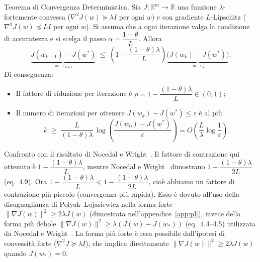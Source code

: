 \documentclass[a4paper,12pt]{article}
\numberwithin{equation}{section}
\numberwithin{figure}{section}
\numberwithin{table}{section}
\begin{document}
\newpage
\begin{thmbox}
  Teorema di Convergenza Deterministica.
  Sia $J: \mathbb{R}^m \to \mathbb{R}$ una funzione $\lambda$-fortemente convessa ($\nabla^2 J(w) \succeq \lambda I$ per ogni $w$) e con gradiente $L$-Lipschitz ($\nabla^2 J(w) \preceq LI$ per ogni $w$).
  Si assuma che a ogni iterazione valga la condizione di accuratezza e si scelga il passo 
  $\alpha = \dfrac{1-\theta}{L}$. Allora
  \[
  \underbrace{J(w_{k+1}) - J(w^*)}_{=: \varepsilon_{k+1}} \;\leq\; 
  \left(1 - \frac{(1-\theta)\lambda}{L}\right) \underbrace{\bigl(J(w_k) - J(w^*)\bigr)}_{=: \varepsilon_k}.
  \]
  Di conseguenza:
  \begin{itemize}
    \item Il fattore di riduzione per iterazione \`e $\rho = 1 - \dfrac{(1-\theta)\lambda}{L} \in (0,1)$;
    \item Il numero di iterazioni per ottenere $J(w_k) - J(w^*) \le \varepsilon$ \`e al pi\`u
    \[
    k \;\ge\; \frac{L}{(1-\theta)\lambda}\,\log\!\left(\frac{J(w_0)-J(w^*)}{\varepsilon}\right)
    = O\!\left(\frac{L}{\lambda}\log\frac{1}{\varepsilon}\right).
    \]
  \end{itemize}
\end{thmbox}

\begin{notebox}
  Confronto con il risultato di Nocedal e Wright~\cite{nocedal2006}.
  Il fattore di contrazione qui ottenuto è $1 - \dfrac{(1-\theta)\lambda}{L}$, mentre Nocedal e Wright~\cite{nocedal2006} dimostrano $1 - \dfrac{(1-\theta)\lambda}{2L}$ (eq.~4.9). Ora $1 - \dfrac{(1-\theta)\lambda}{L} < 1 - \dfrac{(1-\theta)\lambda}{2L}$, cioè abbiamo un fattore di contrazione più piccolo (convergenza più rapida). Esso è dovuto all'uso della disuguaglianza di Polyak--Lojasiewicz nella forma forte $\|\nabla J(w)\|^2 \ge 2\lambda J(w)$ (dimostrata nell'appendice~\ref{app:pl}), invece della forma più debole $\|\nabla J(w)\|^2 \ge \lambda(J(w)-J(w_*))$ (eq.~4.4--4.5) utilizzata da Nocedal e Wright~\cite{nocedal2006}. La forma più forte è resa possibile dall'ipotesi di convessità forte ($\nabla^2 J \succeq \lambda I$), che implica direttamente $\|\nabla J(w)\|^2 \ge 2\lambda J(w)$ quando $J(w_*)=0$.
\end{notebox}
\end{document}
